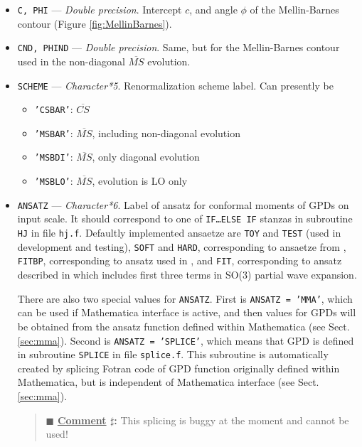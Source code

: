 \documentclass[12pt]{article}
\newcounter{comment}
\newenvironment{commblock}%
{\refstepcounter{comment}%
\begin{quote}\renewcommand{\baselinestretch}{1}
\ttfamily\small$\blacksquare$ \textbf{\underline{Comment} $\sharp$\thecomment:}}%
{\end{quote}}
\begin{document}
\begin{itemize}
\item
\texttt{C, PHI} --- \emph{Double precision}. Intercept $c$, and angle $\phi$ of
the Mellin-Barnes contour (Figure \ref{fig:MellinBarnes}).

\item
\texttt{CND, PHIND} --- \emph{Double precision}. Same, but for 
the Mellin-Barnes contour used in the non-diagonal $\overline{MS}$ evolution.

\item
\texttt{SCHEME} --- \emph{Character*5}. Renormalization scheme label. 
Can presently be 
\begin{itemize}
\item \texttt{'CSBAR'}: $\overline{CS}$
\item \texttt{'MSBAR'}: $\overline{MS}$, including non-diagonal evolution
\item \texttt{'MSBDI'}: $\overline{MS}$, only diagonal evolution
\item \texttt{'MSBLO'}: $\overline{MS}$, evolution is LO only
\end{itemize}

\item
\texttt{ANSATZ} --- \emph{Character*6}. Label of ansatz for conformal moments of GPDs on input scale. 
It should correspond to one of  \texttt{IF\ldots ELSE IF} stanzas in subroutine
\texttt{HJ} in file \texttt{hj.f}. Defaultly implemented ansaetze are
\texttt{TOY} and \texttt{TEST} (used in development and testing), \texttt{SOFT} and \texttt{HARD},
corresponding to ansaetze from \cite{Kumericki:2006xx}, \texttt{FITBP}, corresponding
to ansatz used in \cite{Kumericki:2007sa}, and \texttt{FIT}, corresponding to
ansatz described in  \cite{Kumericki:2009uq} which includes first three terms in SO(3)
partial wave expansion.


There are also two special values for \texttt{ANSATZ}. First is \texttt{ANSATZ = 'MMA'}, which
can be used if Mathematica interface is active, and
then values for GPDs will be obtained from the ansatz function defined within
Mathematica (see Sect. \ref{sec:mma}). Second is \texttt{ANSATZ = 'SPLICE'}, which
means that GPD is defined in subroutine \texttt{SPLICE} in file \texttt{splice.f}. This
subroutine is automatically created by splicing Fotran code of GPD function originally
defined within Mathematica, but is independent of Mathematica interface (see Sect. \ref{sec:mma}).

\begin{commblock}
This splicing is buggy at the moment and cannot be used!
\end{commblock}

\end{itemize}
\end{document}
